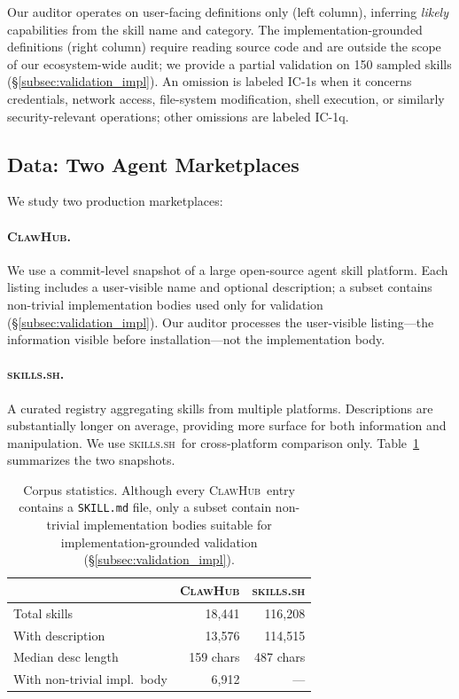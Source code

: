 \documentclass[11pt]{article}
\newcommand{\clawhub}{\textsc{ClawHub}\xspace}
\newcommand{\skillssh}{\textsc{skills.sh}\xspace}
\begin{document}
Our auditor operates on user-facing definitions only
(left column), inferring \emph{likely} capabilities
from the skill name and category.
The implementation-grounded definitions (right column)
require reading source code and are outside the scope
of our ecosystem-wide audit; we provide a partial
validation on 150 sampled skills
(\S\ref{subsec:validation_impl}).
An omission is labeled IC-1s when it concerns
credentials, network access, file-system modification,
shell execution, or similarly security-relevant
operations; other omissions are labeled IC-1q.

\subsection{Data: Two Agent Marketplaces}
\label{subsec:data}

We study two production marketplaces:

\paragraph{\clawhub.}
We use a commit-level snapshot of a large open-source
agent skill platform.
Each listing includes a user-visible name and optional
description; a subset contains non-trivial implementation
bodies used only for validation
(\S\ref{subsec:validation_impl}).
Our auditor processes the user-visible listing---the
information visible before installation---not the
implementation body.

\paragraph{\skillssh.}
A curated registry aggregating skills from multiple platforms.
Descriptions are substantially longer on average, providing
more surface for both information and manipulation.
We use \skillssh\ for cross-platform comparison only.
Table~\ref{tab:corpus} summarizes the two snapshots.

\begin{table}[t]
\centering\small
\begin{tabular}{lrr}
\toprule
& \textbf{\clawhub} & \textbf{\skillssh} \\
\midrule
Total skills & 18,441 & 116,208 \\
With description & 13,576 & 114,515 \\
Median desc length & 159 chars & 487 chars \\
With non-trivial impl.\ body & 6,912 & --- \\
\bottomrule
\end{tabular}
\caption{Corpus statistics. Although every \clawhub\ entry
contains a \texttt{SKILL.md} file, only a subset contain
non-trivial implementation bodies suitable for
implementation-grounded validation (\S\ref{subsec:validation_impl}).}
\label{tab:corpus}
\end{table}
\end{document}
